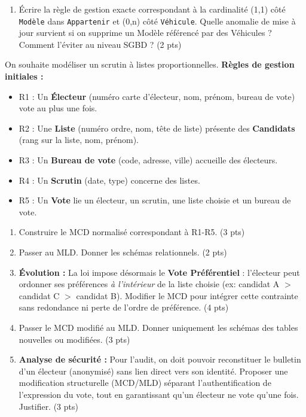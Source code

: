\documentclass[11pt]{article}
\begin{document}
\begin{exercice}
\begin{enumerate}
    \item Écrire la règle de gestion exacte correspondant à la cardinalité (1,1) côté \texttt{Modèle} dans \texttt{Appartenir} et (0,n) côté \texttt{Véhicule}. Quelle anomalie de mise à jour survient si on supprime un Modèle référencé par des Véhicules ? Comment l'éviter au niveau SGBD ? (2 pts)
\end{enumerate}
\end{exercice}

\begin{exercice}
On souhaite modéliser un scrutin à listes proportionnelles. 
\textbf{Règles de gestion initiales :}
\begin{itemize}
    \item R1 : Un \textbf{Électeur} (numéro carte d'électeur, nom, prénom, bureau de vote) vote au plus une fois.
    \item R2 : Une \textbf{Liste} (numéro ordre, nom, tête de liste) présente des \textbf{Candidats} (rang sur la liste, nom, prénom).
    \item R3 : Un \textbf{Bureau de vote} (code, adresse, ville) accueille des électeurs.
    \item R4 : Un \textbf{Scrutin} (date, type) concerne des listes.
    \item R5 : Un \textbf{Vote} lie un électeur, un scrutin, une liste choisie et un bureau de vote.
\end{itemize}
\begin{enumerate}
    \item Construire le MCD normalisé correspondant à R1-R5. (3 pts)
    \item Passer au MLD. Donner les schémas relationnels. (2 pts)
    \item \textbf{Évolution :} La loi impose désormais le \textbf{Vote Préférentiel} : l'électeur peut ordonner ses préférences \textit{à l'intérieur} de la liste choisie (ex: candidat A $>$ candidat C $>$ candidat B). Modifier le MCD pour intégrer cette contrainte sans redondance ni perte de l'ordre de préférence. (4 pts)
    \item Passer le MCD modifié au MLD. Donner uniquement les schémas des tables nouvelles ou modifiées. (3 pts)
    \item \textbf{Analyse de sécurité :} Pour l'audit, on doit pouvoir reconstituer le bulletin d'un électeur (anonymisé) sans lien direct vers son identité. Proposer une modification structurelle (MCD/MLD) séparant l'authentification de l'expression du vote, tout en garantissant qu'un électeur ne vote qu'une fois. Justifier. (3 pts)
\end{enumerate}
\end{exercice}
\end{document}
